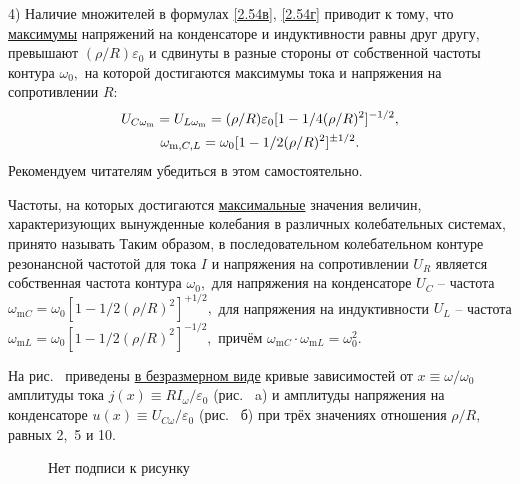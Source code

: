 4) Наличие множителей   в формулах \eqref{2.54в}, \eqref{2.54г} приводит к тому, что \underline{максимумы} напряжений на конденсаторе и индуктивности равны друг другу, превышают $(\rho/R)\varepsilon_0$ и сдвинуты в разные стороны от собственной частоты контура $\omega_0,$ на которой достигаются максимумы тока и напряжения на сопротивлении $R:$
\begin{equation}
	\eqmark{2.57}
	\begin{gathered}[c]
		U_{C\omega_\text{m}}=U_{L\omega_\text{m}}=(\rho/R)\varepsilon_0[1-1/4(\rho/R)^2]^{-1/2},\\
		\omega_{\text{m},C,L}=\omega_0[1-1/2(\rho/R)^2]^{\pm1/2}.
	\end{gathered}
\end{equation}
Рекомендуем читателям убедиться в этом самостоятельно.

Частоты, на которых достигаются \underline{максимальные} значения величин, характеризующих вынужденные колебания в различных колебательных системах, принято называть  Таким образом, в последовательном колебательном контуре резонансной частотой для тока $I$ и напряжения на сопротивлении $U_R$ является собственная частота контура $\omega_0,$ для напряжения на конденсаторе $U_C$ – частота $\omega_{\text{m}C}=\omega_0[1-1/2(\rho/R)^2]^{+1/2},$ для напряжения на индуктивности $U_L$ – частота $\omega_{\text{m}L}=\omega_0[1-1/2(\rho/R)^2]^{-1/2},$ причём $\omega_{\text{m}C}\cdot\omega_{\text{m}L}=\omega_0^2.$
	
На рис.~ приведены \underline{в безразмерном виде} кривые зависимостей от $x\equiv\omega/\omega_0$ амплитуды тока $j(x)\equiv RI_\omega/\varepsilon_0$ (рис.~ a) и амплитуды напряжения на конденсаторе $u(x)\equiv U_{C\omega}/\varepsilon_0$  (рис.~ б) при трёх значениях отношения $\rho/R,$ равных 2,~5 и 10.
\begin{figure}[h]
		\begin{minipage}[h]{0.45\linewidth}
		\end{minipage}
		\hfill
		\begin{minipage}[h]{0.45\linewidth}
		\end{minipage}
		\caption{Нет подписи к рисунку}
\end{figure}

